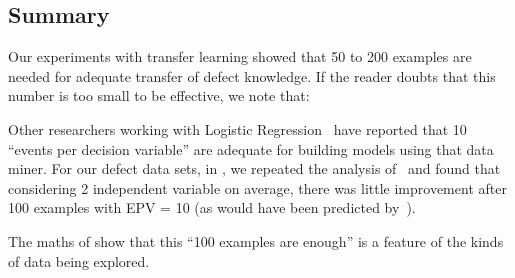 \subsection{Summary}
Our experiments with transfer learning showed that 50 to 200 examples are needed for adequate
transfer of defect knowledge. If the reader doubts that this number is too small to be effective,
we note that:
\squishlist
\item Other researchers working with Logistic Regression~\cite{peduzzi1996simulation}
have reported that 10 ``events per decision variable'' are adequate for building models using that
data miner. For our defect data sets, in , we repeated the analysis of~\cite{peduzzi1996simulation}
and found that considering 2 independent variable on average, there was little improvement after 100 examples with EPV = 10 (as would have been predicted by~\cite{peduzzi1996simulation}).
\item The maths of  show that this ``100 examples are enough'' is a feature of the kinds of
data being explored.
\squishend

